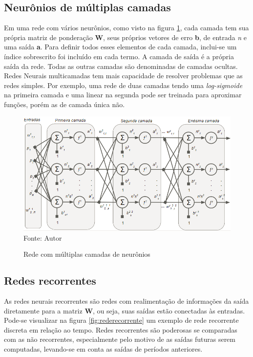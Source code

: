\documentclass[
	12pt,				%
    oneside,			%
	a4paper,			%
	english,			%
	french,				%
	spanish,			%
	brazil,				%
	]{abntex2}
\begin{document}
\subsection {Neurônios de múltiplas camadas} 

Em uma rede com vários neurônios, como visto na figura \ref{fig:Neuronio_multipla_camada}, cada camada tem sua própria matriz de ponderação \textbf{W}, seus próprios vetores de erro \textbf{b}, de entrada \textit{n} e uma saída \textbf{a}. Para definir todos esses elementos de cada camada, inclui-se um índice sobrescrito foi incluído em cada termo. A camada de saída é a própria saída da rede. Todas as outras camadas são denominadas de camadas ocultas. 
Redes Neurais multicamadas tem mais capacidade de resolver problemas que as redes simples. Por exemplo, uma rede de duas camadas tendo uma \textit{log-sigmoide} na primeira camada e uma linear na segunda pode ser treinada para aproximar funções, porém as de camada única não. 

\begin{figure}[H]
    \centering
    \caption{Rede com múltiplas camadas de neurônios}
    \includegraphics[scale=0.65]{neuronio_multi_camada1}\\
    Fonte: Autor\hfill
    \label{fig:Neuronio_multipla_camada}
\end{figure}

\subsection {Redes recorrentes}

As redes neurais recorrentes são redes com realimentação de informações da saída diretamente para a matriz \textbf{W}, ou seja, suas saídas estão conectadas às entradas. Pode-se visualizar na figura \ref{fig:rederecorrente} um exemplo de rede recorrente discreta em relação ao tempo. Redes recorrentes são poderosas se comparadas com as não recorrentes, especialmente pelo motivo de as saídas futuras serem computadas, levando-se em conta as saídas de períodos anteriores.
\end{document}
